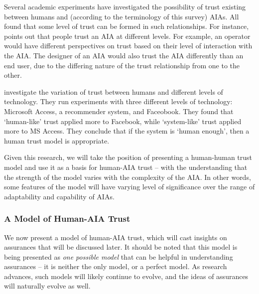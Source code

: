         Several academic experiments have investigated the possibility of trust existing between humans and (according to the terminology of this survey) AIAs. All found that some level of trust can be formed in such relationships. For instance, \citet{Lacher2014-yc} points out that people trust an AIA at different levels. For example, an operator would have different perspectives on trust based on their level of interaction with the AIA. The designer of an AIA would also trust the AIA differently than an end user, due to the differing nature of the trust relationship from one to the other. 

        \citet{Tripp2011-cq} investigate the variation of trust between humans and different levels of technology. They run experiments with three different levels of technology: Microsoft Access, a recommender system, and Faceobook. They found that `human-like' trust applied more to Facebook, while `system-like' trust applied more to MS Access. They conclude that if the system is `human enough', then a human trust model is appropriate.

        Given this research, we will take the position of presenting a human-human trust model and use it as a basis for human-AIA trust -- with the understanding that the strength of the model varies with the complexity of the AIA. In other words, some features of the model will have varying level of significance over the range of adaptability and capability of AIAs.

\subsubsection{A Model of Human-AIA Trust}
        We now present a model of human-AIA trust, which will cast insights on assurances that will be discussed later. It should be noted that this model is being presented as \emph{one possible model} that can be helpful in understanding assurances -- it is neither the only model, or a perfect model. As research advances, such models will likely continue to evolve, and the ideas of assurances will naturally evolve as well.

